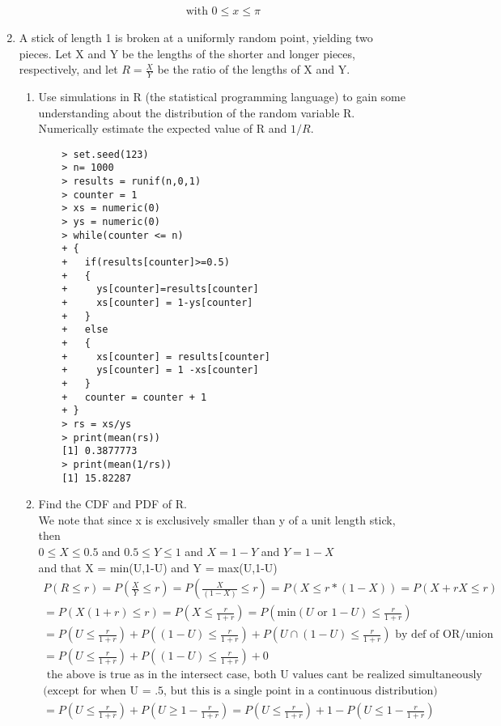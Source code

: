 \documentclass[11pt]{article}
\begin{document}
\begin{enumerate}
\begin{enumerate}
\begin{gather}
	\text{with } 0 \le x \le \pi
	\end{gather}
\end{enumerate}
\item A stick of length 1 is broken at a uniformly random point, yielding two pieces. Let X and Y be the lengths
of the shorter and longer pieces, respectively, and let $R = \frac{X}{Y}$ be the ratio of the lengths of X and Y.
\begin{enumerate}
	\item  Use simulations in R (the statistical programming language) to gain some understanding about the distribution of the random variable R. Numerically estimate the expected value of R and $1/R$.
	\begin{verbatim}
	> set.seed(123)
	> n= 1000
	> results = runif(n,0,1)
	> counter = 1
	> xs = numeric(0)
	> ys = numeric(0)
	> while(counter <= n)
	+ {
	+   if(results[counter]>=0.5)
	+   {
	+     ys[counter]=results[counter]
	+     xs[counter] = 1-ys[counter]
	+   }
	+   else
	+   {
	+     xs[counter] = results[counter]
	+     ys[counter] = 1 -xs[counter]
	+   }
	+   counter = counter + 1
	+ }
	> rs = xs/ys
	> print(mean(rs))
	[1] 0.3877773
	> print(mean(1/rs))
	[1] 15.82287
	\end{verbatim}
	\item Find the CDF and PDF of R.\\
	We note that since x is exclusively smaller than y of a unit length stick, then \\
	$0\le X \le 0.5$ and $0.5 \le Y \le 1$ and $X = 1-Y $ and $Y= 1-X$\\
	and that X = min(U,1-U) and Y = max(U,1-U)
	\begin{gather}
	P(R \le r) = P(\frac{X}{Y} \le r) =  P(\frac{X}{(1-X)} \le r) = P(X \le r*(1-X)) = P(X + rX \le r) \\
	= P(X(1+r) \le r) = P(X \le \frac{r}{1+r}) = P(\text{min}(U \text{ or }1-U) \le \frac{r}{1+r}) \\
	= P(U\le \frac{r}{1+r}) + P((1-U) \le \frac{r}{1+r}) + P(U\cap(1-U)\le \frac{r}{1+r}) \text{ by def of OR/union} \\
	= P(U\le \frac{r}{1+r}) + P((1-U) \le \frac{r}{1+r}) + 0 \\
	\text{ the above is true as in the intersect case, both U values cant be realized simultaneously}\\
	\text{(except for when U = .5, but this is a single point in a continuous distribution)}\\
	= P(U\le \frac{r}{1+r}) + P(U \ge 1 - \frac{r}{1+r} ) =  P(U\le \frac{r}{1+r}) + 1 - P(U \le 1 - \frac{r}{1+r} ) \\

\end{gather}
\end{enumerate}
\end{enumerate}
\end{document}
